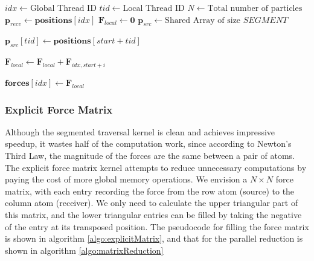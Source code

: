 \documentclass[12pt]{article}
\begin{document}
\begin{algorithm}
\caption{Segmented Traversal} \label{algo:segmentedTraversal}
\begin{algorithmic}[1]
\State $idx \gets \text{Global Thread ID}$
\State $tid \gets \text{Local Thread ID}$
\State $N \gets \text{Total number of particles}$
\State $\mathbf{p}_{recv} \gets \mathbf{positions}[idx]$ 
\State $\mathbf{F}_{local} \gets \mathbf{0}$ 
\State $\mathbf{p}_{src} \gets \text{Shared Array of size } SEGMENT$ 


    \State $\mathbf{p}_{src}[tid] \gets \mathbf{positions}[start + tid]$
    \State {}
    
        
        \State $\mathbf{F}_{local} \gets \mathbf{F}_{local} + \mathbf{F}_{idx,start+i}$
    \EndFor
    \State {}
\EndFor

\State $\mathbf{forces}[idx] \gets \mathbf{F}_{local}$
\end{algorithmic}
\end{algorithm}

\subsubsection{Explicit Force Matrix}
Although the segmented traversal kernel is clean and achieves impressive speedup, it wastes half of the computation work, since according to Newton’s Third Law, the magnitude of the forces are the same between a pair of atoms. The explicit force matrix kernel attempts to reduce unnecessary computations by paying the cost of more global memory operations. We envision a $N\times N$ force matrix, with each entry recording the force from the row atom (source) to the column atom (receiver). We only need to calculate the upper triangular part of this matrix, and the lower triangular entries can be filled by taking the negative of the entry at its transposed position. The pseudocode for filling the force matrix is shown in algorithm \ref{algo:explicitMatrix}, and that for the parallel reduction is shown in algorithm \ref{algo:matrixReduction}
\end{document}
